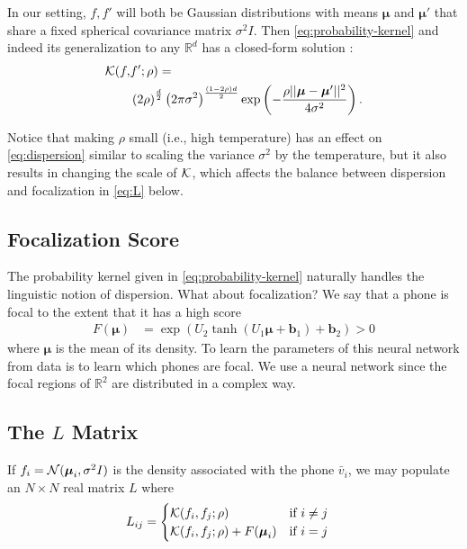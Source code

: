 \documentclass[11pt,a4paper]{article}
\newcommand{\vbar}{\bar{v}}
\newcommand{\vmu}{{\boldsymbol \mu}}
\begin{document}
In our setting, $f,f'$ will both be Gaussian distributions with means $\vmu$ and $\vmu'$ that share a fixed spherical
covariance matrix $\sigma^2I$.  Then \cref{eq:probability-kernel} and indeed its generalization to any $\mathbb{R}^d$
has a closed-form solution \cite[\S 3.1]{JebaraKH04}:
\begin{align}\label{eq:dispersion}
  {\cal K}(f, & f'; \rho) = \\
  & \left(2\rho\right)^{\frac{d}{2}}\left(2\pi\sigma^2\right)^{\frac{(1 - 2\rho)d}{2}}\exp\left(-\frac{\rho ||\vmu - \vmu'||^2}{4\sigma^2}  \right). \nonumber
\end{align}

\noindent Notice that making $\rho$ small (i.e., high temperature) has an effect on \eqref{eq:dispersion} similar to scaling the variance $\sigma^2$ by the temperature, but it also results in changing the scale of ${\cal K}$, which affects the balance between dispersion and focalization in \eqref{eq:L} below.

\subsection{Focalization Score}

The probability kernel given in \cref{eq:probability-kernel} naturally handles the linguistic notion of dispersion. What about focalization?  We say that a phone is focal to the extent that it has a high score
\begin{align}\label{eq:focalization}
F(\vmu) &= \exp\left(U_2 \tanh(U_1 \vmu + \mathbf{b}_1) + \mathbf{b}_2 \right) > 0
\end{align}
where $\vmu$ is the mean of its density.  To learn the parameters of this neural network from data is to learn which phones are focal.  We use a neural network since the focal regions of $\mathbb{R}^2$ are distributed in a complex way.

\subsection{The $L$ Matrix}

If $f_i = {\cal N}(\vmu_i,\sigma^2 I)$ is the density associated with the phone $\vbar_i$, we may populate an $N \times N$ real matrix $L$ where
\begin{align}\label{eq:L}
  L_{ij} &= \begin{cases}
    {\cal K}(f_i,f_j; \rho) & \text{if }i \neq j \\
    {\cal K}(f_i,f_j; \rho) + F(\vmu_i) & \text{if }i = j
  \end{cases}
\end{align}
\end{document}
